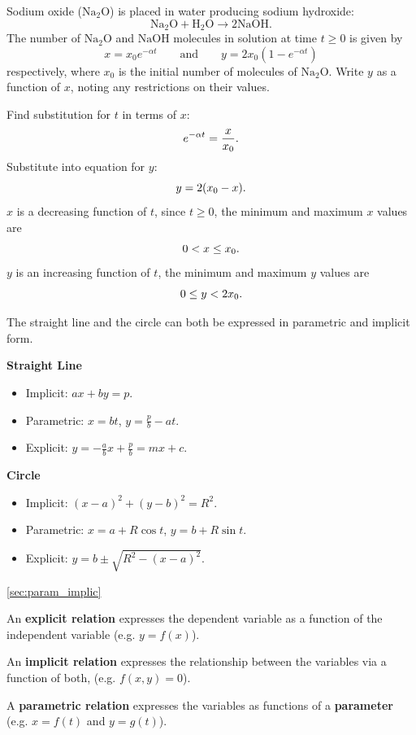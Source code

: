 \goodbreak 
\begin{example}[Lecture]
Sodium oxide ($\mathrm{Na_2O}$) is placed in water producing sodium hydroxide:
\[
\mathrm{Na_2O+H_2O\longrightarrow 2NaOH}.
\]
The number of $\mathrm{Na_2O}$ and $\mathrm{NaOH}$ molecules in solution at time $t\geq0$ is given by
\[
x=x_0e^{-\alpha t} \qquad\text{and}\qquad y=2x_0\left(1-e^{-\alpha t}\right)
\]
respectively, where $x_0$ is the initial number of molecules of $\mathrm{Na_2O}$. Write $y$ as a function of $x$, noting any restrictions on their values.
\end{example}
%
\begin{solution}
Find substitution for $t$ in terms of $x$:
\[
e^{-\alpha t}=\frac{x}{x_0}.
\]
Substitute into equation for $y$:
\[
y=2(x_0-x).
\]
$x$ is a decreasing function of $t$, since $t\geq0$, the minimum and maximum $x$ values are
\[
0<x\leq x_0.
\]
$y$ is an increasing function of $t$, the minimum and maximum $y$ values are
\[
0\leq y<2x_0.
\]
\end{solution}

The straight line and the circle can both be expressed in parametric and implicit form.

\textbf{Straight Line}
\begin{itemize}
    \item Implicit: $ax+by=p$.
    \item Parametric: $x=bt$, $y=\frac{p}{b}-at$.
    \item Explicit: $y=-\frac{a}{b}x+\frac{p}{b}=mx+c$.
\end{itemize}

\textbf{Circle}
\begin{itemize}
\item Implicit: $(x-a)^2+(y-b)^2=R^2$.
\item Parametric: $x=a+R\cos t$, $y=b+R\sin t$.
\item Explicit: $y=b\pm\sqrt{R^2-(x-a)^2}$.
\end{itemize}

\begin{recap}{\ref{sec:param_implic}}
\item An \textbf{explicit relation} expresses the dependent variable as a function of the independent variable (e.g. $y=f(x)$).
\item An \textbf{implicit relation} expresses the relationship between the variables via a function of both, (e.g. $f(x,y)=0$).
\item A \textbf{parametric relation} expresses the variables as functions of a \textbf{parameter} (e.g. $x=f(t)$ and $y=g(t)$).
\end{recap}

